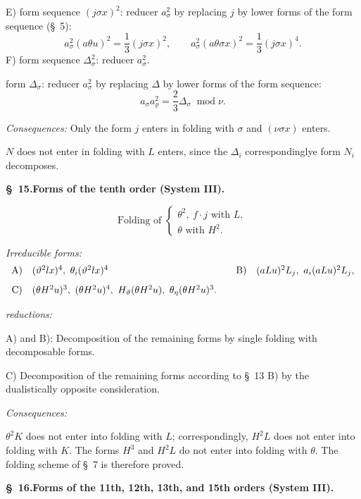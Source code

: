 \documentclass[11pt]{article}
\newcommand{\A}{\Delta}
\newcommand{\R}{\varrho}
\newcommand{\modu}[1]{\;\operatorname{mod} #1}
\providecommand{\modu}[1]{\;\operatorname{mod} #1}
\begin{document}
E) form sequence $(j\sigma x)^2$: reducer $a_\sigma^2$ by replacing $j$ by lower forms of the form sequence (\S\ 5):
\[
a_\sigma^2(a\theta u)^2=\frac13(j\sigma x)^2,
\qquad
a_\sigma^2(a\theta\sigma x)^2=\frac13(j\sigma x)^4.
\]
F) form sequence $\A_\sigma^2$: reducer $a_\sigma^2$.

form $\A_\sigma$: reducer $a_\sigma^2$ by replacing $\A$ by lower forms of the form sequence:
\[
a_\sigma a_\R^2=\frac23\A_\sigma\modu{\nu}.
\]

\noindent\emph{Consequences:} Only the form $j$ enters in folding with $\sigma$ and $(\nu\sigma x)$ enters.

$N$ does not enter in folding with $L$ enters, since the $\A_i$ correspondinglye form $N_i$ decomposes.

\begin{center}
\textbf{\S\ 15.\quad Forms of the tenth order (System III).}
\end{center}
\[
\text{Folding of }\left\{\begin{array}{l}
\theta^2,
\ f\cdot j\text{ with }L,\\
\theta\text{ with }H^2.
\end{array}\right.
\]

\noindent\emph{Irreducible forms:}
\[
\begin{array}{c@{\quad}l@{\qquad}c@{\quad}l}
\text{A)}&(\vartheta^2lx)^4,
\ \theta_i(\vartheta^2lx)^4&
\text{B)}&(aLu)^2L_j,
\ a_i(aLu)^2L_j,\\[0.8em]
\text{C)}&(\theta H^2u)^3,
\ (\theta H^2u)^4,
\ H_\vartheta(\theta H^2u),
\ \theta_\eta(\theta H^2u)^3.
\end{array}
\]

\noindent\emph{reductions:}

A) and B): Decomposition of the remaining forms by single folding with decomposable forms.

C) Decomposition of the remaining forms according to \S\ 13 B) by the dualistically opposite consideration.

\noindent\emph{Consequences:}

$\theta^2K$ does not enter into folding with $L$; correspondingly, $H^2L$ does not enter into folding with $K$. The forms $H^3$ and $H^2L$ do not enter into folding with $\theta$. The folding scheme of \S\ 7 is therefore proved.

\begin{center}
\textbf{\S\ 16.\quad Forms of the 11th, 12th, 13th, and 15th orders (System III).}
\end{center}
\end{document}
